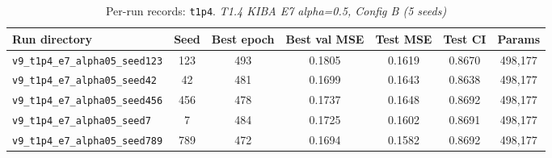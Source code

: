 \begin{table}[!h]
\centering\scriptsize
\caption{Per-run records: \texttt{t1p4}. \textit{T1.4 KIBA E7 alpha=0.5, Config B (5 seeds)}}
\label{tab:v9_runs_t1p4}
\begin{tabular}{p{4.8cm}cccccc}
\toprule
Run directory & Seed & Best epoch & Best val MSE & Test MSE & Test CI & Params \\
\midrule
\texttt{v9\_\allowbreak{}t1p4\_\allowbreak{}e7\_\allowbreak{}alpha05\_\allowbreak{}seed123} & 123 & 493 & 0.1805 & 0.1619 & 0.8670 & 498,177 \\
\texttt{v9\_\allowbreak{}t1p4\_\allowbreak{}e7\_\allowbreak{}alpha05\_\allowbreak{}seed42} & 42 & 481 & 0.1699 & 0.1643 & 0.8638 & 498,177 \\
\texttt{v9\_\allowbreak{}t1p4\_\allowbreak{}e7\_\allowbreak{}alpha05\_\allowbreak{}seed456} & 456 & 478 & 0.1737 & 0.1648 & 0.8692 & 498,177 \\
\texttt{v9\_\allowbreak{}t1p4\_\allowbreak{}e7\_\allowbreak{}alpha05\_\allowbreak{}seed7} & 7 & 484 & 0.1725 & 0.1602 & 0.8691 & 498,177 \\
\texttt{v9\_\allowbreak{}t1p4\_\allowbreak{}e7\_\allowbreak{}alpha05\_\allowbreak{}seed789} & 789 & 472 & 0.1694 & 0.1582 & 0.8692 & 498,177 \\
\bottomrule
\end{tabular}
\end{table}

